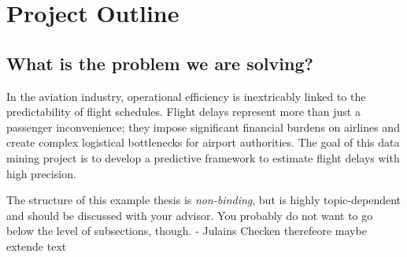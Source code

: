 \documentclass[a4paper,oneside,bibliography=totoc]{scrbook}
\begin{document}
\mainmatter

\chapter{Project Outline}
\label{ch:intro}

\section{What is the problem we are solving?}
In the aviation industry, operational efficiency is inextricably linked to the predictability of flight schedules. Flight delays represent more than just a passenger inconvenience; they impose significant financial burdens on airlines and create complex logistical bottlenecks for airport authorities. The goal of this data mining project is to develop a predictive framework to estimate flight delays with high precision.

The structure of this example thesis is \emph{non-binding}, but is highly
topic-dependent and should be discussed with your advisor. You probably do not
want to go below the level of subsections, though.
- Julains Checken therefeore maybe extende text 
\end{document}
